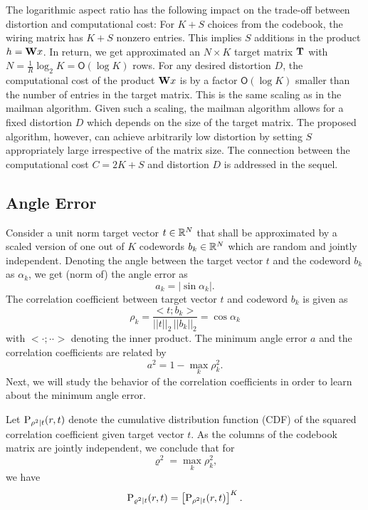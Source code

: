 \documentclass[twocolumn]{IEEEtran}
\begin{document}
The logarithmic aspect ratio has the following impact on the trade-off between distortion and computational cost:
For $K+S$ choices from the codebook, the wiring matrix has $K+S$ nonzero entries. This implies $S$ additions in the product $h= \mathbf{W} x$.  
In return, we get approximated  an $N\times K$ target matrix $\mathbf{T}$ with $N=\frac1R\log_2 K = \mathsf O(\log K)$ rows. For any desired distortion $D$, the computational cost of the product $\mathbf{W} x$ is by a factor $\mathsf O(\log K)$ smaller than the number of entries in the target matrix. This is the same scaling as in the mailman algorithm. 
Given such a scaling, the mailman algorithm allows for a fixed distortion $D$ which depends on the size of the target matrix. 
The proposed algorithm, however, can achieve arbitrarily low distortion by setting $S$ appropriately large irrespective of the matrix size. The connection between the computational cost $C=2K+S$ and distortion $D$ is addressed in the sequel.

\subsection{Angle Error}

Consider a unit norm target vector $t\in\mathbb{R}^{N}$ that shall be approximated by a scaled version of one out of $K$ codewords $b_k\in\mathbb{R}^{N}$ which are random and jointly independent.
Denoting the angle between the target vector $t$ and the codeword $b_k$ as $\alpha_k$, we get (norm of) the angle error as
\begin{equation}
a_k = |\sin \alpha_k|.
\end{equation}
The correlation coefficient between target vector $t$ and codeword $b_k$ is given as 
\begin{equation}
\rho_k = \frac{<t;b_k>}{||t||_2\, ||b_k||_2} = \cos\alpha_k
\end{equation}
with $<\cdot;\cdot\cdot>$ denoting the inner product.
The minimum angle error $a$ and the correlation coefficients are related by 
\begin{equation}
a^2= 1 - \max\limits_k \rho_k^2.
\end{equation}
Next, we will study the behavior of the correlation coefficients in order to learn about the minimum angle error.

Let ${\text P}_{\rho^2|t}(r,t)$ denote the cumulative distribution function (CDF) of the squared correlation coefficient given target vector $t$. 
As the columns of the codebook matrix are jointly independent, we conclude that for
\begin{equation}
\varrho^2 = \max_k \rho_k^2,
\end{equation}
we have
\begin{equation}
{\text P}_{\varrho^2|t}(r,t) = \left[{\text P}_{\rho^2|t}(r,t)\right]^K.
\end{equation}
\end{document}
